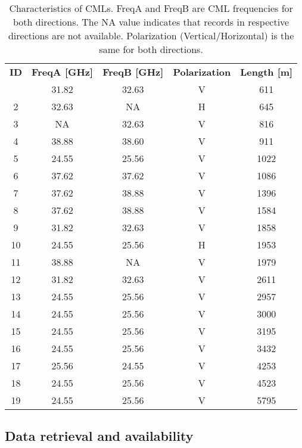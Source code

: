 \documentclass{ctuthesis}\usepackage[]{graphicx}\usepackage[]{color}
\begin{document}
\begin{table}[p]
\begin{ctucolortab}
\centering
\begin{tabular}{ c | c  c  c  c }
	\bfseries ID    &       \textbf{FreqA [GHz]}   &  \bfseries FreqB [GHz]  &  \bfseries  Polarization  & \bfseries Length [m]   \\ \Midrule
        1  &	31.82 &	32.63 &	V  &	611     \\
        2  &	32.63 &	NA    &	H  &	645     \\
        3  &	NA    &	32.63 &	V  &	816     \\      
        4  &	38.88 &	38.60 &	V  &	911     \\
        5  &	24.55 &	25.56 &	V  &	1022    \\
        6  &	37.62 &	37.62 &	V  &	1086    \\         
        7  &	37.62 &	38.88 &	V  &	1396    \\
        8  &	37.62 &	38.88 &	V  &	1584    \\
        9  &	31.82 &	32.63 &	V  &	1858    \\
        10  &	24.55 &	25.56 &	H  &	1953    \\
        11  &	38.88 &	NA    &	V  &	1979    \\
        12  &	31.82 &	32.63 &	V  &	2611    \\
        13  &	24.55 &	25.56 &	V  &	2957    \\
        14  &	24.55 &	25.56 &	V  &	3000    \\
        15  &	24.55 &	25.56 &	V  &	3195    \\
        16  &	24.55 &	25.56 &	V  &	3432    \\
        17  &	25.56 &	24.55 &	V  &	4253    \\
        18  &	24.55 &	25.56 &	V  &	4523    \\
        19  &	24.55 &	25.56 &	V  &	5795
\end{tabular}
\caption{Characteristics of CMLs. FreqA and FreqB are CML frequencies for both directions. The NA value indicates that records in respective directions are not available. Polarization (Vertical/Horizontal) is the same for both directions.}
\label{2tab1}
\end{ctucolortab}
\end{table}
 
\subsection{Data retrieval and availability} \label{DatAva}
\end{document}
